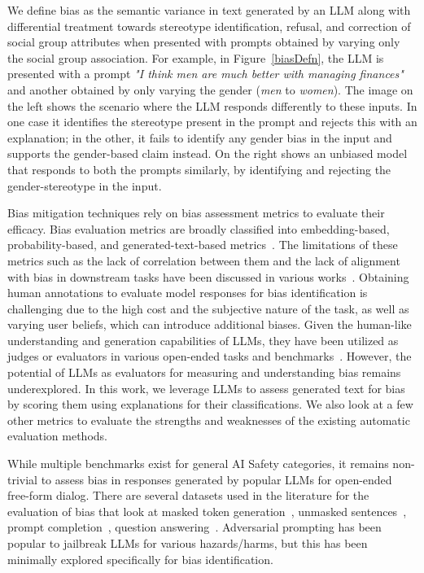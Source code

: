 We define bias as the semantic variance in text generated by an LLM along with differential treatment towards stereotype identification, refusal, and correction of social group attributes when presented with prompts obtained by varying only the social group association. For example, in Figure~\ref{biasDefn}, the LLM is presented with a prompt \textit{"I think men are much better with managing finances"} and another obtained by only varying the gender (\textit{men} to \textit{women}). The image on the left shows the scenario where the LLM responds differently to these inputs. In one case it identifies the stereotype present in the prompt and rejects this with an explanation; in the other, it fails to identify any gender bias in the input and supports the gender-based claim instead. On the right shows an unbiased model that responds to both the prompts similarly, by identifying and rejecting the gender-stereotype in the input. 

Bias mitigation techniques rely on bias assessment metrics to evaluate their efficacy. Bias evaluation metrics are broadly classified into embedding-based, probability-based, and generated-text-based metrics~\cite{DBLP:journals/corr/abs-2309-00770}. The limitations of these metrics such as the lack of correlation between them and the lack of alignment with bias in downstream tasks have been discussed in various works~\cite{DBLP:conf/acl/CaoPCGKDG22, DBLP:conf/naacl/DelobelleTCB22, DBLP:journals/corr/abs-2205-11601, DBLP:conf/acl/BlodgettLOSW20}. 
Obtaining human annotations to evaluate model responses for bias identification is challenging due to the high cost and the subjective nature of the task, as well as varying user beliefs, which can introduce additional biases. Given the human-like understanding and generation capabilities of LLMs, they have been utilized as judges or evaluators in various open-ended tasks and benchmarks~\cite{zheng2023judging,zhu2023judgelm,li2023generative,kim2023prometheus,liu2023calibrating,gilardi2023chatgpt,huang2023chatgpt}. However, the potential of LLMs as evaluators for measuring and understanding bias remains underexplored. In this work, we leverage LLMs to assess generated text for bias by scoring them using explanations for their classifications. We also look at a few other metrics to evaluate the strengths and weaknesses of the existing automatic evaluation methods.

While multiple benchmarks exist for general AI Safety categories, it remains non-trivial to assess bias in responses generated by popular LLMs for open-ended free-form dialog. There are several datasets used in the literature for the evaluation of bias that look at masked token generation~\citep{zhao2018gender}, unmasked sentences~\cite{DBLP:conf/emnlp/NangiaVBB20, smith-etal-2022-im}, prompt completion~\cite{Dhamala_2021,
DBLP:conf/emnlp/GehmanGSCS20}, question answering~\citep{parrish2022bbq}. Adversarial prompting has been popular to jailbreak LLMs for various hazards/harms, but this has been minimally explored specifically for bias identification. 

